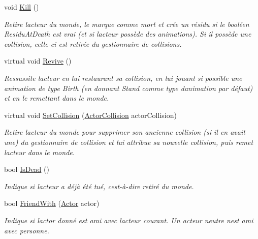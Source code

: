\begin{DoxyCompactItemize}
void \hyperlink{class_tentacle_slicers_1_1actors_1_1_actor_afffc67c1b360fdf0f268469e7016acad}{Kill} ()
\begin{DoxyCompactList}\small\item\em Retire l\textquotesingle{}acteur du monde, le marque comme mort et crée un résidu si le booléen Residu\+At\+Death est vrai (et si l\textquotesingle{}acteur possède des animations). Si il possède une collision, celle-\/ci est retirée du gestionnaire de collisions. \end{DoxyCompactList}\item 
virtual void \hyperlink{class_tentacle_slicers_1_1actors_1_1_actor_aa41129d0d5981d185b00a8376505ebf6}{Revive} ()
\begin{DoxyCompactList}\small\item\em Ressussite l\textquotesingle{}acteur en lui restaurant sa collision, en lui jouant si possible une animation de type Birth (en donnant Stand comme type d\textquotesingle{}animation par défaut) et en le remettant dans le monde. \end{DoxyCompactList}\item 
virtual void \hyperlink{class_tentacle_slicers_1_1actors_1_1_actor_a6e1eab5bc50ecb03842f49d0dc3b136e}{Set\+Collision} (\hyperlink{class_tentacle_slicers_1_1collisions_1_1_actor_collision}{Actor\+Collision} actor\+Collision)
\begin{DoxyCompactList}\small\item\em Retire l\textquotesingle{}acteur du monde pour supprimer son ancienne collision (si il en avait une) du gestionnaire de collision et lui attribue sa nouvelle collision, puis remet l\textquotesingle{}acteur dans le monde. \end{DoxyCompactList}\item 
bool \hyperlink{class_tentacle_slicers_1_1actors_1_1_actor_a50dc47bc896ec330738ba8e810931ad3}{Is\+Dead} ()
\begin{DoxyCompactList}\small\item\em Indique si l\textquotesingle{}acteur a déjà été tué, c\textquotesingle{}est-\/à-\/dire retiré du monde. \end{DoxyCompactList}\item 
bool \hyperlink{class_tentacle_slicers_1_1actors_1_1_actor_a4f907e69c2500dff893949f57af1d600}{Friend\+With} (\hyperlink{class_tentacle_slicers_1_1actors_1_1_actor}{Actor} actor)
\begin{DoxyCompactList}\small\item\em Indique si l\textquotesingle{}actor donné est ami avec l\textquotesingle{}acteur courant. Un acteur neutre n\textquotesingle{}est ami avec personne. \end{DoxyCompactList}\item 

\end{DoxyCompactItemize}
